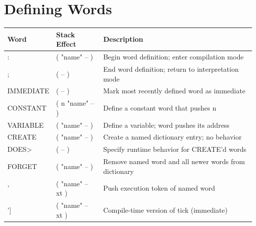 \section*{Defining Words}
\begin{longtable}{>{\ttfamily}lp{4.5cm}p{7cm}}
\toprule
\normalfont Word & Stack Effect & Description \\
\midrule
\endhead
\bottomrule
\endfoot
:       & ( "name" -- )       & Begin word definition; enter compilation mode \\
;       & ( -- )              & End word definition; return to interpretation mode \\
IMMEDIATE & ( -- )            & Mark most recently defined word as immediate \\
CONSTANT & ( n "name" -- )   & Define a constant word that pushes n \\
VARIABLE & ( "name" -- )     & Define a variable; word pushes its address \\
CREATE  & ( "name" -- )      & Create a named dictionary entry; no behavior \\
DOES>   & ( -- )             & Specify runtime behavior for CREATE'd words \\
FORGET  & ( "name" -- )      & Remove named word and all newer words from dictionary \\
'       & ( "name" -- xt )   & Push execution token of named word \\
{[}'{}]     & ( "name" -- xt )   & Compile-time version of tick (immediate) \\
\end{longtable}

